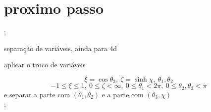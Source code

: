 \documentclass[a4paper,12pt]{article}
\begin{document}
\section{proximo passo}

;

separa\c{c}\~{a}o de vari\'{a}veis, ainda para 4d

aplicar o troco de vari\'{a}veis 

\begin{equation*}
\xi =\cos \theta _{3},\ \zeta =\sinh \chi ,\ \theta _{1},\theta _{2}
\end{equation*}%
\begin{equation*}
-1\leq \xi \leq 1,\ 0\leq \zeta <\infty ,\ 0\leq \theta _{1}<2\pi ,\ 0\leq
\theta _{2},\theta _{3}<\pi 
\end{equation*}%
e separar a parte com $\left( \theta _{1},\theta _{2}\right) $ e a parte com 
$\left( \theta _{3},\chi \right) $%
\begin{equation*}
\end{equation*}%
;
\end{document}
